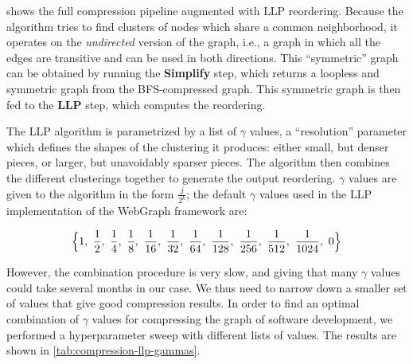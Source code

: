  shows the full compression pipeline
augmented with \gls{LLP} reordering. Because the algorithm tries to find
clusters of nodes which share a common neighborhood, it operates on the
\emph{undirected} version of the graph, i.e., a graph in which all the edges
are transitive and can be used in both directions. This ``symmetric'' graph can
be obtained by running the \textbf{Simplify} step, which returns a loopless and
symmetric graph from the \gls{BFS}-compressed graph. This symmetric graph is
then fed to the \textbf{LLP} step, which computes the reordering.

The \gls{LLP} algorithm is parametrized by a list of $\gamma$ values, a
``resolution'' parameter which defines the shapes of the clustering it
produces: either small, but denser pieces, or larger, but unavoidably sparser
pieces. The algorithm then combines the different clusterings together to
generate the output reordering. $\gamma$ values are given to the algorithm in
the form $\displaystyle \frac{j}{2^k}$; the default $\gamma$ values used in the
\gls{LLP} implementation of the WebGraph framework are:

\[
    \Bigl\{
    1,~\frac{1}{2},~\frac{1}{4},~\frac{1}{8},~\frac{1}{16},~\frac{1}{32},~%
    \frac{1}{64},~\frac{1}{128},~\frac{1}{256},~\frac{1}{512},~\frac{1}{1024},~0
    \Bigr\}
\]

However, the combination procedure is very slow, and giving that many $\gamma$
values could take several months in our case. We thus need to narrow down a
smaller set of values that give good compression results.
In order to find an
optimal combination of $\gamma$ values for compressing the graph of software
development, we performed a hyperparameter sweep with different lists of
values. The results are shown in \cref{tab:compression-llp-gammas}.

